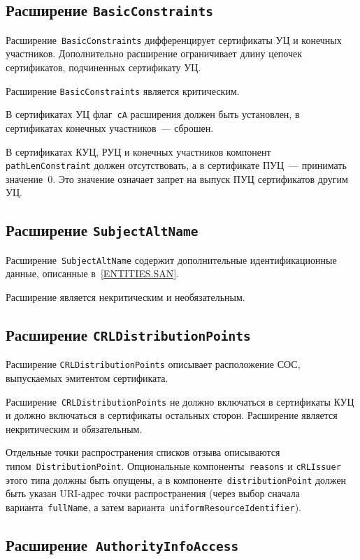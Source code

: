 \subsection{Расширение \texttt{BasicConstraints}}

Расширение~\texttt{BasicConstraints} дифференцирует сертификаты УЦ и
конечных участников. Дополнительно расширение ограничивает 
длину цепочек сертификатов, подчиненных сертификату УЦ.

Расширение \texttt{BasicConstraints} является критическим.

В сертификатах УЦ флаг~\texttt{сA} расширения должен быть 
установлен, в сертификатах конечных участников~--- сброшен. 

В сертификатах КУЦ, РУЦ и конечных участников компонент 
\texttt{pathLenConstraint} должен отсутствовать,
а в сертификате ПУЦ~--- принимать значение~0. 
Это значение означает запрет на выпуск ПУЦ сертификатов 
другим УЦ. 

\subsection{Расширение \texttt{SubjectAltName}}

Расширение~\texttt{SubjectAltName} содержит дополнительные 
идентификационные данные, описанные в~\ref{ENTITIES.SAN}. 

Расширение является некритическим и необязательным.

\subsection{Расширение \texttt{CRLDistributionPoints}}

Расширение \texttt{CRLDistributionPoints} описывает расположение СОС, 
выпускаемых эмитентом сертификата. 

Расширение~\texttt{CRLDistributionPoints} 
не должно включаться в сертификаты КУЦ и должно включаться в
сертификаты остальных сторон. Расширение является некритическим и обязательным.

Отдельные точки распространения списков отзыва описываются 
типом~\texttt{DistributionPoint}. Опциональные компоненты~\texttt{reasons} 
и \texttt{cRLIssuer} этого типа должны быть опущены, а в 
компоненте~\texttt{distributionPoint} должен быть указан 
URI-адрес точки распространения (через выбор сначала 
варианта~\texttt{fullName}, а затем 
варианта~\texttt{uniformResourceIdentifier}). 

\subsection{Расширение~\texttt{AuthorityInfoAccess}}

